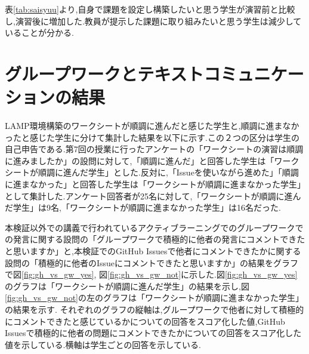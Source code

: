 \documentclass[11pt, a4paper]{jreport}
\begin{document}
表\ref{tab:saisyuu}より,自身で課題を設定し構築したいと思う学生が演習前と比較し,演習後に増加した.教員が提示した課題に取り組みたいと思う学生は減少していることが分かる.

\section{グループワークとテキストコミュニケーションの結果}\label{gw_tc_diff}

LAMP環境構築のワークシートが順調に進んだと感じた学生と,順調に進まなかったと感じた学生に分けて集計した結果を以下に示す.この２つの区分は学生の自己申告である.第7回の授業に行ったアンケートの「ワークシートの演習は順調に進みましたか」の設問に対して,「順調に進んだ」と回答した学生は「ワークシートが順調に進んだ学生」とした.反対に,「Issueを使いながら進めた」「順調に進まなかった」と回答した学生は「ワークシートが順調に進まなかった学生」として集計した.アンケート回答者が25名に対して,「ワークシートが順調に進んだ学生」は9名,「ワークシートが順調に進まなかった学生」は16名だった.

本検証以外での講義で行われているアクティブラーニングでのグループワークでの発言に関する設問の「グループワークで積極的に他者の発言にコメントできたと思いますか」と,本検証でのGitHub Issuesで他者にコメントできたかに関する設問の「積極的に他者のIssueにコメントできたと思いますか」の結果をグラフで図\ref{fig:gh_vs_gw_yes}, 図\ref{fig:gh_vs_gw_not}に示した.図\ref{fig:gh_vs_gw_yes}のグラフは「ワークシートが順調に進んだ学生」の結果を示し,図\ref{fig:gh_vs_gw_not}の左のグラフは「ワークシートが順調に進まなかった学生」の結果を示す.
それぞれのグラフの縦軸は,グループワークで他者に対して積極的にコメントできたと感じているかについての回答をスコア化した値,GitHub Issuesで積極的に他者の問題にコメントできたかについての回答をスコア化した値を示している.横軸は学生ごとの回答を示している.
\end{document}
